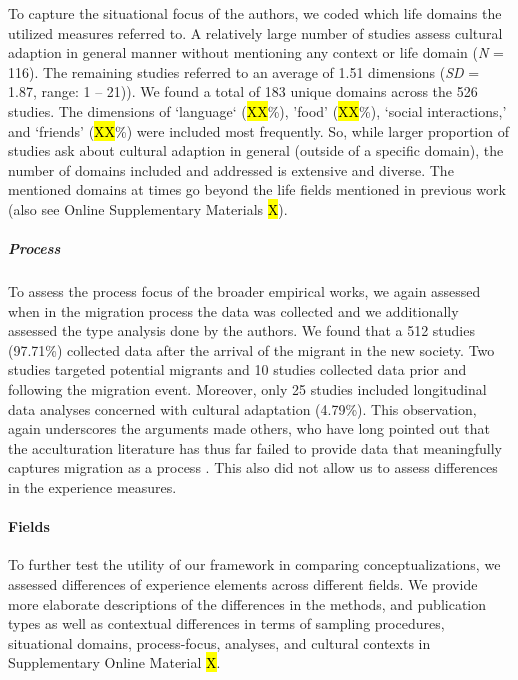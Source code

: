 To capture the situational focus of the authors, we coded which life
domains the utilized measures referred to. A relatively large number of
studies assess cultural adaption in general manner without mentioning
any context or life domain (\textit{N} = 116). The remaining studies
referred to an average of 1.51 dimensions (\textit{SD} = 1.87, range: 1
-- 21)). We found a total of 183 unique domains across the 526 studies.
The dimensions of `language` (\hl{XX}\%), 'food' (\hl{XX}\%), `social
interactions,' and `friends' (\hl{XX}\%) were included most frequently.
So, while larger proportion of studies ask about cultural adaption in
general (outside of a specific domain), the number of domains included
and addressed is extensive and diverse. The mentioned domains at times
go beyond the life fields mentioned in previous work (also see Online
Supplementary Materials \hl{X}).

\subparagraph{Process}

To assess the process focus of the broader empirical works, we again
assessed when in the migration process the data was collected and we
additionally assessed the type analysis done by the authors. We found
that a 512 studies (97.71\%) collected data after the arrival of the
migrant in the new society. Two studies targeted potential migrants and
10 studies collected data prior and following the migration event.
Moreover, only 25 studies included longitudinal data analyses concerned
with cultural adaptation (4.79\%). This observation, again underscores
the arguments made others, who have long pointed out that the
acculturation literature has thus far failed to provide data that
meaningfully captures migration as a process
\citep[e.g.,][]{Brown2011, Ward2019}. This also did not allow us to
assess differences in the experience measures.

\paragraph{Fields}

To further test the utility of our framework in comparing
conceptualizations, we assessed differences of experience elements
across different fields. We provide more elaborate descriptions of the
differences in the methods, and publication types as well as contextual
differences in terms of sampling procedures, situational domains,
process-focus, analyses, and cultural contexts in Supplementary Online
Material \hl{X}.

